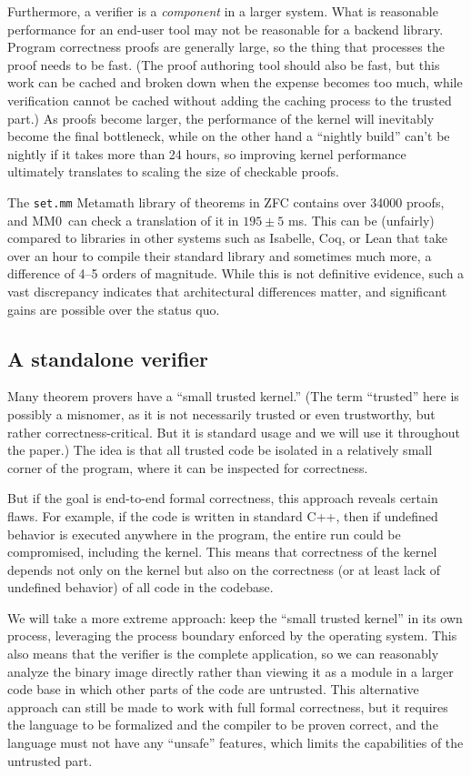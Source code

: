 \documentclass[runningheads]{llncs}
\newcommand{\mmO}{\textsf{MM0}}
\begin{document}
Furthermore, a verifier is a \emph{component} in a larger system. What is reasonable performance for an end-user tool may not be reasonable for a backend library. Program correctness proofs are generally large, so the thing that processes the proof needs to be fast. (The proof authoring tool should also be fast, but this work can be cached and broken down when the expense becomes too much, while verification cannot be cached without adding the caching process to the trusted part.) As proofs become larger, the performance of the kernel will inevitably become the final bottleneck, while on the other hand a ``nightly build'' can't be nightly if it takes more than 24 hours, so improving kernel performance ultimately translates to scaling the size of checkable proofs.

The \texttt{set.mm} Metamath library of theorems in \textsf{ZFC} contains over 34000 proofs, and \mmO\ can check a translation of it in $195\pm5$ ms. This can be (unfairly) compared to libraries in other systems such as Isabelle, Coq, or Lean that take over an hour to compile their standard library and sometimes much more, a difference of 4--5 orders of magnitude. While this is not definitive evidence, such a vast discrepancy indicates that architectural differences matter, and significant gains are possible over the status quo.

\subsection{A standalone verifier}

Many theorem provers have a ``small trusted kernel.'' (The term ``trusted'' here is possibly a misnomer, as it is not necessarily trusted or even trustworthy, but rather correctness-critical. But it is standard usage and we will use it throughout the paper.) The idea is that all trusted code be isolated in a relatively small corner of the program, where it can be inspected for correctness.

But if the goal is end-to-end formal correctness, this approach reveals certain flaws. For example, if the code is written in standard C++, then if undefined behavior is executed anywhere in the program, the entire run could be compromised, including the kernel. This means that correctness of the kernel depends not only on the kernel but also on the correctness (or at least lack of undefined behavior) of all code in the codebase.

We will take a more extreme approach: keep the ``small trusted kernel'' in its own process, leveraging the process boundary enforced by the operating system. This also means that the verifier is the complete application, so we can reasonably analyze the binary image directly rather than viewing it as a module in a larger code base in which other parts of the code are untrusted. This alternative approach can still be made to work with full formal correctness, but it requires the language to be formalized and the compiler to be proven correct, and the language must not have any ``unsafe'' features, which limits the capabilities of the untrusted part.
\end{document}
